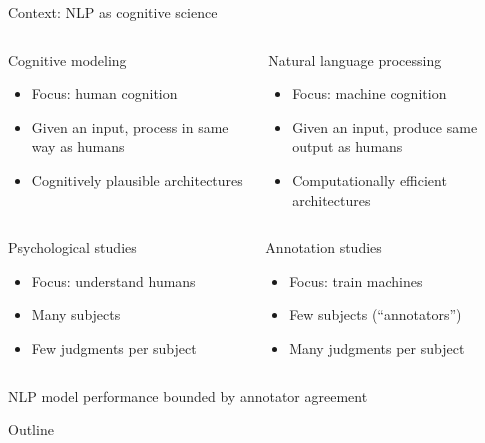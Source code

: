 \documentclass[12pt,compress]{beamer}
\begin{document}
\begin{frame}{Context: NLP as cognitive science}
\begin{columns}
\begin{column}{0.48\textwidth}
Cognitive modeling
\begin{itemize}[<+->]
\item Focus: human cognition
\item Given an input, process in same way as humans
\item Cognitively plausible architectures
\end{itemize}
\end{column}
\begin{column}{0.48\textwidth}
Natural language processing
\begin{itemize}[<+(-3)->]
\item Focus: machine cognition
\item Given an input, produce same output as humans
\item Computationally efficient architectures
\end{itemize}
\end{column}
\end{columns}
\bigskip
{}
\begin{columns}
\begin{column}{0.48\textwidth}
Psychological studies
\begin{itemize}[<+(-3)->]
\item Focus: understand humans
\item Many subjects
\item Few judgments per subject
\end{itemize}
\end{column}
\begin{column}{0.48\textwidth}
Annotation studies
\begin{itemize}[<+(-6)->]
\item Focus: train machines
\item Few subjects (``annotators'')
\item Many judgments per subject
\end{itemize}
\end{column}
\end{columns}
\bigskip
{}
\centering
\alert{NLP model performance bounded by annotator agreement}
\end{frame}


\begin{frame}{Outline}
\tableofcontents
\end{frame}
\end{document}
